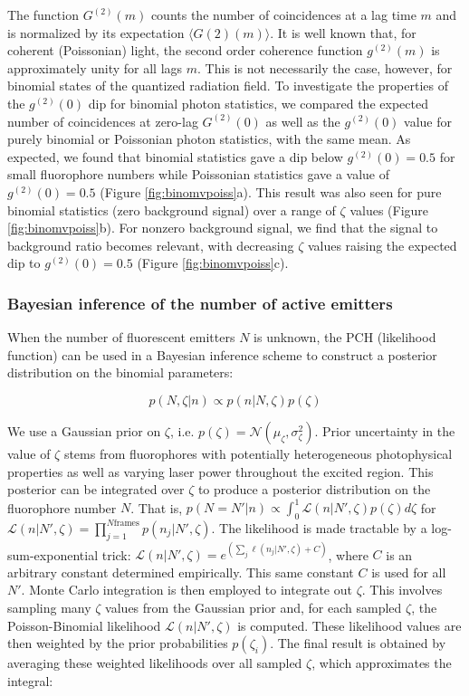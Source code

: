 The function $G^{(2)}(m)$ counts the number of coincidences at a lag time $m$ and is normalized by its expectation $\langle G(2)(m)\rangle$. It is well known that, for coherent (Poissonian) light, the second order coherence function $g^{(2)}(m)$ is approximately unity for all lags $m$. This is not necessarily the case, however, for binomial states \parencite{Stoler1985} of the quantized radiation field. To investigate the properties of the $g^{(2)}(0)$ dip for binomial photon statistics, we compared the expected number of coincidences at zero-lag $G^{(2)}(0)$ as well as the $g^{(2)}(0)$ value for purely binomial or Poissonian photon statistics, with the same mean. As expected, we found that binomial statistics gave a dip below $g^{(2)}(0) =0.5$ for small fluorophore numbers while Poissonian statistics gave a value of $g^{(2)}(0) =0.5$ (Figure \ref{fig:binomvpoiss}a). This result was also seen for pure binomial statistics (zero background signal) over a range of $\zeta$ values (Figure \ref{fig:binomvpoiss}b). For nonzero background signal, we find that the signal to background ratio becomes relevant, with decreasing $\zeta$ values raising the expected dip to $g^{(2)}(0) =0.5$ (Figure \ref{fig:binomvpoiss}c).


\subsubsection{Bayesian inference of the number of active emitters}

When the number of fluorescent emitters $N$ is unknown, the PCH (likelihood function) can be used in a Bayesian inference scheme to construct a posterior distribution on the binomial parameters:

\begin{equation}
p(N,\zeta\lvert n) \propto p(n\lvert N,\zeta)p(\zeta)
\end{equation}

We use a Gaussian prior on $\zeta$, i.e. $p(\zeta) = \mathcal{N}(\mu_{\zeta},\sigma_{\zeta}^2)$. Prior uncertainty in the value of $\zeta$ stems from fluorophores with potentially heterogeneous photophysical properties as well as varying laser power throughout the excited region. This posterior can be integrated over $\zeta$ to produce a posterior distribution on the fluorophore number $N$. That is, $p(N=N'\lvert n) \propto \int_{0}^{1} \mathcal{L}(n\lvert N',\zeta)p(\zeta) d\zeta$ for $\mathcal{L}(n\lvert N',\zeta)=\prod_{j=1}^{N\mathrm{frames}} p(n_{j}\lvert N',\zeta)$. The likelihood is made tractable by a log-sum-exponential trick: $\mathcal{L}(n\lvert N',\zeta) = e^{\left(\sum_{j}\ell (n_{j}\lvert N',\zeta) + C\right)}$, where $C$ is an arbitrary constant determined empirically. This same constant $C$ is used for all $N'$. Monte Carlo integration is then employed to integrate out $\zeta$. This involves sampling many $\zeta$ values from the Gaussian prior and, for each sampled $\zeta$, the Poisson-Binomial likelihood $\mathcal{L}(n\lvert N',\zeta)$ is computed. These likelihood values are then weighted by the prior probabilities $p(\zeta_i)$. The final result is obtained by averaging these weighted likelihoods over all sampled $\zeta$, which approximates the integral:

